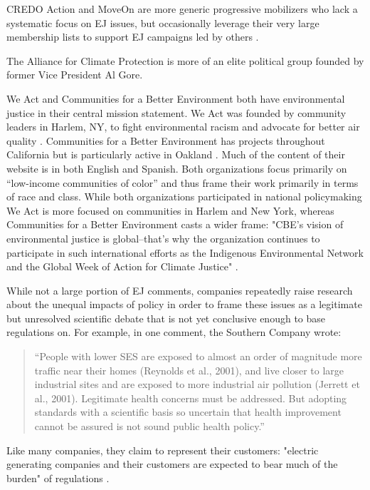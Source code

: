 \documentclass[
      12pt,
        ]{article}
\begin{document}
CREDO Action and MoveOn are more generic progressive
mobilizers who lack a systematic focus on EJ issues,
but occasionally leverage their very large membership lists to support
EJ campaigns led by others
\citep{MoveOn.org2017, CREDO2017}.

The Alliance for Climate Protection is more of an elite political group founded by former Vice President Al
Gore.

We Act and Communities for a Better Environment both have environmental
justice in their central mission statement. We Act was founded by
community leaders in Harlem, NY, to fight environmental racism and
advocate for better air quality \citep{WEACT2017}. Communities for a Better Environment has projects throughout California but is particularly
active in Oakland \citep{CBECAL2017}. Much of the
content of their website is in both English and Spanish. Both
organizations focus primarily on ``low-income communities of color'' and
thus frame their work primarily in terms of race and class. While both
organizations participated in national policymaking We Act is more
focused on communities in Harlem and New York, whereas Communities for a
Better Environment casts a wider frame: "CBE's vision of environmental
justice is global--that's why the organization continues to participate
in such international efforts as the Indigenous Environmental Network
and the Global Week of Action for Climate Justice" \citep{CBECAL2017}.

While not a large portion of EJ comments, companies repeatedly raise research about the unequal impacts of policy in order to frame these issues as a legitimate but unresolved scientific debate that is not yet conclusive enough to base regulations
on. For example, in one comment, the Southern Company wrote:

\begin{quote}
``People with lower SES are exposed to almost an order of magnitude
more traffic near their homes (Reynolds et al., 2001), and live closer
to large industrial sites and are exposed to more industrial air
pollution (Jerrett et al., 2001). Legitimate health concerns must be
addressed. But adopting standards with a scientific basis so uncertain
that health improvement cannot be assured is not sound public health
policy.''
\end{quote}

Like many companies, they claim to represent their customers:
"electric generating companies and their customers are expected to bear
much of the burden" of regulations \citep{Hobson2004}.
\end{document}
